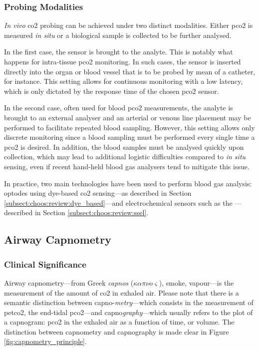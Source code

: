 \subsubsection{Probing Modalities}

\textit{In vivo} \gls{co2} probing can be achieved under two distinct modalities. Either \gls{pco2} is measured \textit{in situ} or a biological sample is collected to be further analysed.

In the first case, the sensor is brought to the analyte. This is notably what happens for intra-tissue \gls{pco2} monitoring. In such cases, the sensor is inserted directly into the organ or blood vessel that is to be probed by mean of a catheter, for instance. This setting allows for continuous monitoring with a low latency, which is only dictated by the response time of the chosen \gls{pco2} sensor\cite{ganter2003}.

In the second case, often used for blood \gls{pco2} measurements, the analyte is brought to an external analyser and an arterial or venous line placement may be performed to facilitate repeated blood sampling. However, this setting allows only discrete monitoring since a blood sampling must be performed every single time a \gls{pco2} is desired. In addition, the blood samples must be analysed quickly upon collection, which may lead to additional logistic difficulties compared to \textit{in situ} sensing\cite{nanji1984}, even if recent hand-held blood gas analysers tend to mitigate this issue\cite{luukkonen2016}.

In practice, two main technologies have been used to perform blood gas analysis: optodes using dye-based \gls{co2} sensing---as described in Section \ref{subsect:choos:review:dye_based}\cite{ganter2003, menzel2003}---and electrochemical sensors such as the \ssel{}---described in Section \ref{subsect:choos:review:ssel}\cite{badnjevic2011}.

\subsection{Airway Capnometry}\label{subsect:airway_cap}

\subsubsection{Clinical Significance}\label{subsect:airway_capno_cc}

Airway capnometry---from Greek \textit{capnos} ($\kappa\alpha\pi\nu o \varsigma$), smoke, vapour---is the measurement of the amount of \gls{co2} in exhaled air. Please note that there is a semantic distinction between capno-\emph{metry}---which consists in the measurement of \gls{petco2}, the end-tidal \gls{pco2}---and capno\emph{graphy}---which usually refers to the plot of a capnogram: \gls{pco2} in the exhaled air as a function of time, or volume. The distinction between capnometry and capnography is made clear in Figure \ref{fig:capnometry_principle}.

